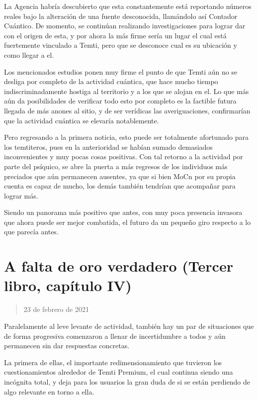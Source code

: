 \documentclass[
  spanish,
]{book}
\begin{document}
La Agencia habría descubierto que esta constantemente está reportando números reales bajo la alteración de una fuente desconocida, llamándolo así Contador Cuántico. De momento, se continúan realizando investigaciones para lograr dar con el origen de esta, y por ahora la más firme sería un lugar el cual está fuertemente vinculado a Temti, pero que se desconoce cual es su ubicación y como llegar a el.

Los mencionados estudios ponen muy firme el punto de que Temti aún no se desliga por completo de la actividad cuántica, que hace mucho tiempo indiscriminadamente hostiga al territorio y a los que se alojan en el. Lo que más aún da posibilidades de verificar todo esto por completo es la factible futura llegada de más anones al sitio, y de ser verídicas las averiguaciones, confirmarían que la actividad cuántica se elevaría notablemente.

Pero regresando a la primera noticia, esto puede ser totalmente afortunado para los temtiteros, pues en la anterioridad se habían sumado demasiados inconvenientes y muy pocas cosas positivas. Con tal retorno a la actividad por parte del psíquico, se abre la puerta a más regresos de los individuos más preciados que aún permanecen ausentes, ya que si bien MoCn por su propia cuenta es capaz de mucho, los demás también tendrían que acompañar para lograr más.

Siendo un panorama más positivo que antes, con muy poca presencia invasora que ahora puede ser mejor combatida, el futuro da un pequeño giro respecto a lo que parecía antes.

\hypertarget{a-falta-de-oro-verdadero-tercer-libro-capuxedtulo-iv}{%
\section{A falta de oro verdadero (Tercer libro, capítulo IV)}\label{a-falta-de-oro-verdadero-tercer-libro-capuxedtulo-iv}}

\begin{quote}
23 de febrero de 2021
\end{quote}

Paralelamente al leve levante de actividad, también hay un par de situaciones que de forma progresiva comenzaron a llenar de incertidumbre a todos y aún permanecen sin dar respuestas concretas.

La primera de ellas, el importante redimensionamiento que tuvieron los cuestionamientos alrededor de Temti Premium, el cual continua siendo una incógnita total, y deja para los usuarios la gran duda de si se están perdiendo de algo relevante en torno a ella.
\end{document}
